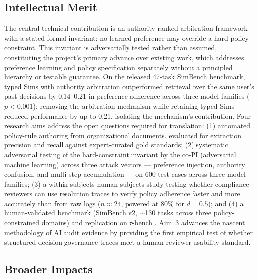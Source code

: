 \documentclass[11pt]{article}
\begin{document}
\subsection*{Intellectual Merit}

The central technical contribution is an authority-ranked arbitration framework with a stated formal invariant: no learned preference may override a hard policy constraint. This invariant is adversarially tested rather than assumed, constituting the project's primary advance over existing work, which addresses preference learning and policy specification separately without a principled hierarchy or testable guarantee. On the released 47-task SimBench benchmark, typed Sims with authority arbitration outperformed retrieval over the same user's past decisions by 0.14--0.21 in preference adherence across three model families ($p < 0.001$); removing the arbitration mechanism while retaining typed Sims reduced performance by up to 0.21, isolating the mechanism's contribution. Four research aims address the open questions required for translation: (1) automated policy-rule authoring from organizational documents, evaluated for extraction precision and recall against expert-curated gold standards; (2) systematic adversarial testing of the hard-constraint invariant by the co-PI (adversarial machine learning) across three attack vectors --- preference injection, authority confusion, and multi-step accumulation --- on 600 test cases across three model families; (3) a within-subjects human-subjects study testing whether compliance reviewers can use resolution traces to verify policy adherence faster and more accurately than from raw logs ($n \approx 24$, powered at 80\% for $d = 0.5$); and (4) a human-validated benchmark (SimBench v2, $\sim$130 tasks across three policy-constrained domains) and replication on $\tau$-bench \citep{yao2024tau}. Aim~3 advances the nascent methodology of AI audit evidence by providing the first empirical test of whether structured decision-governance traces meet a human-reviewer usability standard.

\subsection*{Broader Impacts}
\end{document}
